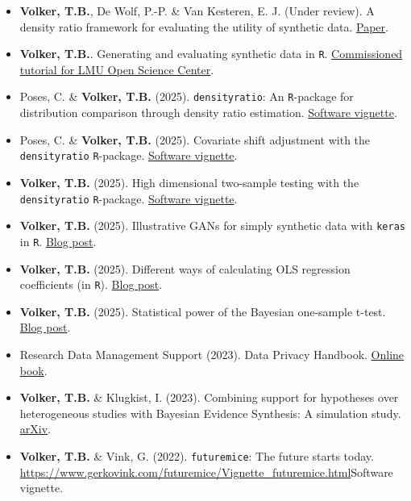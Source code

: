 \documentclass[11pt,a4paper,roman,colorlinks,linkcolor = blue]{moderncv}        %
\begin{document}
\begin{itemize}
\item[$\circ$] \textbf{Volker, T.B.}, De Wolf, P.-P. \& Van Kesteren, E. J. (Under review). A density ratio framework for evaluating the utility of synthetic data. \href{https://arxiv.org/pdf/2408.13167}{Paper}.
\item[$\circ$] \textbf{Volker, T.B.}. Generating and evaluating synthetic data in \texttt{R}. \href{https://lmu-osc.github.io/synthetic-data-tutorial/}{Commissioned tutorial for LMU Open Science Center}.
\item[$\circ$] Poses, C. \& \textbf{Volker, T.B.} (2025). \texttt{densityratio}: An \texttt{R}-package for distribution comparison through density ratio estimation. \href{https://thomvolker.github.io/densityratio/articles/densityratio.html}{Software vignette}.
\item[$\circ$] Poses, C. \& \textbf{Volker, T.B.} (2025). Covariate shift adjustment with the \texttt{densityratio} \texttt{R}-package. \href{https://thomvolker.github.io/densityratio/articles/covariate-shift.html}{Software vignette}.
\item[$\circ$] \textbf{Volker, T.B.} (2025). High dimensional two-sample testing with the \texttt{densityratio} \texttt{R}-package. \href{https://thomvolker.github.io/densityratio/articles/high-dim-testing.html}{Software vignette}.
\item[$\circ$] \textbf{Volker, T.B.} (2025). Illustrative GANs for simply synthetic data with \texttt{keras} in \texttt{R}. \href{https://thomvolker.github.io/blog/2507_gans_in_r/}{Blog post}.
\item[$\circ$] \textbf{Volker, T.B.} (2025). Different ways of calculating OLS regression coefficients (in \texttt{R}). \href{https://thomvolker.github.io/blog/2506_regression/}{Blog post}.
\item[$\circ$] \textbf{Volker, T.B.} (2025). Statistical power of the Bayesian one-sample t-test. \href{https://thomvolker.github.io/bf-power-ttest/bayes-ttest-power.html}{Blog post}.
\item[$\circ$] Research Data Management Support (2023). Data Privacy Handbook. \href{https://utrechtuniversity.github.io/dataprivacyhandbook/}{Online book}.
\item[$\circ$]\textbf{Volker, T.B.} \& Klugkist, I. (2023). Combining support for hypotheses over heterogeneous studies with Bayesian Evidence Synthesis: A simulation study. \href{https://arxiv.org/pdf/2312.15032.pdf}{arXiv}.
\item[$\circ$] \textbf{Volker, T.B.} \& Vink, G. (2022). \texttt{futuremice}: The future starts today. \url{https://www.gerkovink.com/futuremice/Vignette_futuremice.html}{Software vignette}.
\end{itemize}
\end{document}
